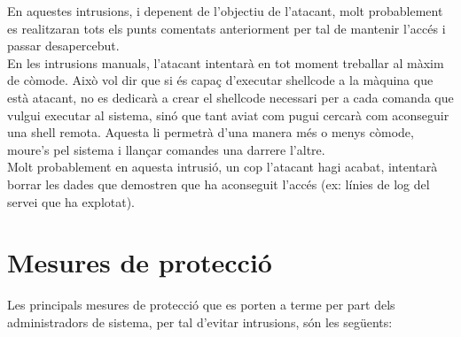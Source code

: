 En aquestes intrusions, i depenent de l'objectiu de l'atacant, molt probablement es realitzaran tots els punts comentats anteriorment
per tal de mantenir l'accés i passar desapercebut.  \\

En les intrusions manuals, l'atacant intentarà en tot moment treballar al màxim de còmode.
Això vol dir que si és capaç d'executar shellcode a la màquina que està atacant, no es dedicarà a crear el shellcode
necessari per a cada comanda que vulgui executar al sistema, sinó que tant aviat com pugui cercarà com
aconseguir una shell remota. Aquesta li permetrà d'una manera més o menys còmode, moure's pel sistema i llançar comandes una 
darrere l'altre. \\

Molt probablement en aquesta intrusió, un cop l'atacant hagi acabat, intentarà borrar les dades que demostren que
ha aconseguit l'accés (ex: línies de log del servei que ha explotat).

\section{Mesures de protecció}

Les principals mesures de protecció que es porten a terme per part dels administradors de sistema, per tal d'evitar
intrusions, són les següents:

